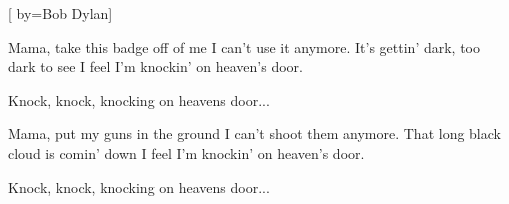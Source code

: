[
	by={Bob Dylan}]

\beginverse
Mama, take this badge off of me
I can't use it anymore.
It's gettin' dark, too dark to see
I feel I'm knockin' on heaven's door.
\endverse

\beginchorus
Knock, knock, knocking on heavens door...
\endchorus

\beginverse
Mama, put my guns in the ground
I can't shoot them anymore.
That long black cloud is comin' down
I feel I'm knockin' on heaven's door.
\endverse

\beginchorus
Knock, knock, knocking on heavens door...
\endchorus

\endsong
